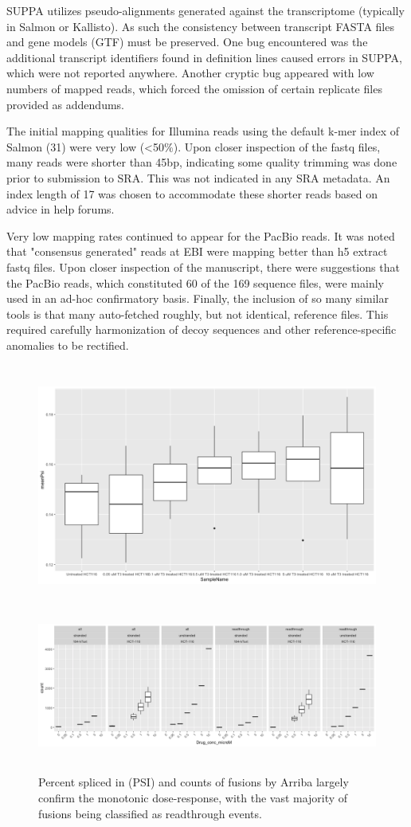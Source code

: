 \documentclass{drexelthesis}
\begin{document}
SUPPA utilizes pseudo-alignments generated against the transcriptome (typically in Salmon or Kallisto). As such the consistency between transcript FASTA files and gene models (GTF) must be preserved. One bug encountered was the additional transcript identifiers found in definition lines caused errors in SUPPA, which were not reported anywhere. Another cryptic bug appeared with low numbers of mapped reads, which forced the omission of certain replicate files provided as addendums.

The initial mapping qualities for Illumina reads using the default k-mer index of Salmon (31) were very low (<50$\%$). Upon closer inspection of the fastq files, many reads were shorter than 45bp, indicating some quality trimming was done prior to submission to SRA. This was not indicated in any SRA metadata. An index length of 17 was chosen to accommodate these shorter reads based on advice in help forums.

Very low mapping rates continued to appear for the PacBio reads. It was noted that "consensus generated" reads at EBI were mapping better than h5 extract fastq files. Upon closer inspection of the manuscript, there were suggestions that the PacBio reads, which constituted 60 of the 169 sequence files, were mainly used in an ad-hoc confirmatory basis. Finally, the inclusion of so many similar tools is that many auto-fetched roughly, but not identical, reference files. This required carefully harmonization of decoy sequences and other reference-specific anomalies to be rectified.

\begin{figure}[h!]
	\centering
	\includegraphics[width=13.76cm,height=8.03cm]{./images/arriba1.png}
    \includegraphics[width=13.76cm,height=4.98cm]{./images/arriba2.png}
	\caption{Percent spliced in (PSI) and counts of fusions by Arriba largely confirm the monotonic dose-response, with the vast majority of fusions being classified as readthrough events.}
	\label{arriba}
\end{figure}
\end{document}
